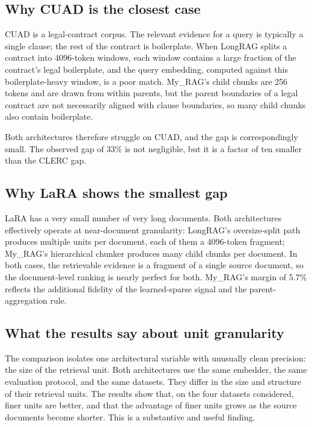 \documentclass[11pt,a4paper]{article}
\begin{document}
\subsection{Why CUAD is the closest case}
CUAD is a legal-contract corpus. The relevant evidence for a query
is typically a single clause; the rest of the contract is
boilerplate. When LongRAG splits a contract into
\SI{4096}{}-token windows, each window contains a large fraction of
the contract's legal boilerplate, and the query embedding, computed
against this boilerplate-heavy window, is a poor match. My\_RAG's
child chunks are \SI{256}{} tokens and are drawn from within
parents, but the parent boundaries of a legal contract are not
necessarily aligned with clause boundaries, so many child chunks
also contain boilerplate.

Both architectures therefore struggle on CUAD, and the gap is
correspondingly small. The observed gap of \num{33}\% is not
negligible, but it is a factor of ten smaller than the CLERC gap.

\subsection{Why LaRA shows the smallest gap}
LaRA has a very small number of very long documents. Both
architectures effectively operate at near-document granularity:
LongRAG's oversize-split path produces multiple units per document,
each of them a \SI{4096}{}-token fragment; My\_RAG's hierarchical
chunker produces many child chunks per document. In both cases, the
retrievable evidence is a fragment of a single source document, so
the document-level ranking is nearly perfect for both. My\_RAG's
margin of \num{5.7}\% reflects the additional fidelity of the
learned-sparse signal and the parent-aggregation rule.

\subsection{What the results say about unit granularity}
The comparison isolates one architectural variable with unusually
clean precision: the size of the retrieval unit. Both architectures
use the same embedder, the same evaluation protocol, and the same
datasets. They differ in the size and structure of their retrieval
units. The results show that, on the four datasets considered, finer
units are better, and that the advantage of finer units grows as
the source documents become shorter. This is a substantive and
useful finding.
\end{document}
